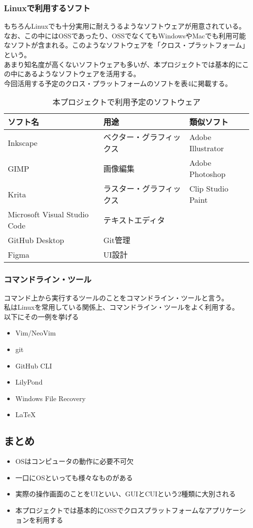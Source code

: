 \documentclass{ltjsarticle}
\begin{document}
\subsubsection{Linuxで利用するソフト}
もちろんLinuxでも十分実用に耐えうるようなソフトウェアが用意されている。\\
なお、この中にはOSSであったり、OSSでなくてもWindowsやMacでも利用可能なソフトが含まれる。このようなソフトウェアを「クロス・プラットフォーム」という。\\
あまり知名度が高くないソフトウェアも多いが、本プロジェクトでは基本的にこの中にあるようなソフトウェアを活用する。\\
今回活用する予定のクロス・プラットフォームのソフトを表4に掲載する。
\begin{table}
    \caption{本プロジェクトで利用予定のソフトウェア}
    \begin{center}
        \begin{tabular}{lll}\hline
            ソフト名 & 用途 & 類似ソフト \\ \hline \hline
            Inkscape & ベクター・グラフィックス & Adobe Illustrator \\ \hline
            GIMP & 画像編集 & Adobe Photoshop \\ \hline
            Krita & ラスター・グラフィックス & Clip Studio Paint \\ \hline
            Microsoft Visual Studio Code & テキストエディタ \\ \hline
            GitHub Desktop & Git管理 \\ \hline
            Figma & UI設計 \\ \hline
        \end{tabular}
    \end{center}
\end{table}
\subsubsection{コマンドライン・ツール}
コマンド上から実行するツールのことをコマンドライン・ツールと言う。\\
私はLinuxを常用している関係上、コマンドライン・ツールをよく利用する。\\
以下にその一例を挙げる
\begin{itemize}
    \item Vim/NeoVim
    \item git
    \item GitHub CLI
    \item LilyPond
    \item Windows File Recovery
    \item LaTeX
\end{itemize}
\subsection{まとめ}
\begin{itemize}
    \item OSはコンピュータの動作に必要不可欠
    \item 一口にOSといっても様々なものがある
    \item 実際の操作画面のことをUIといい、GUIとCUIという2種類に大別される
    \item 本プロジェクトでは基本的にOSSでクロスプラットフォームなアプリケーションを利用する
\end{itemize}
\end{document}
